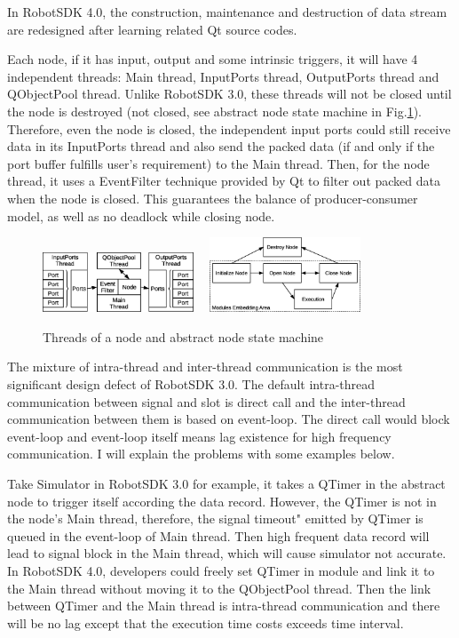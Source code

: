 \documentclass[a4paper,10pt]{book}
\begin{document}
In RobotSDK 4.0, the construction, maintenance and destruction of data stream are redesigned after learning related Qt source codes.

Each node, if it has input, output and some intrinsic triggers, it will have 4 independent threads: Main thread, InputPorts thread, OutputPorts thread and QObjectPool thread. Unlike RobotSDK 3.0, these threads will not be closed until the node is destroyed (not closed, see abstract node state machine in Fig.\ref{fig:nodestate}). Therefore, even the node is closed, the independent input ports could still receive data in its InputPorts thread and also send the packed data (if and only if the port buffer fulfills user's requirement) to the Main thread. Then, for the node thread, it uses a EventFilter technique provided by Qt to filter out packed data when the node is closed. This guarantees the balance of producer-consumer model, as well as no deadlock while closing node.

\begin{figure}
 \centering
 \includegraphics[width=0.4\textwidth]{img/threads.eps}~~
 \includegraphics[width=0.4\textwidth]{img/nodestate.eps}
 \caption{Threads of a node and abstract node state machine}
 \label{fig:nodestate}
\end{figure}

The mixture of intra-thread and inter-thread communication is the most significant design defect of RobotSDK 3.0. The default intra-thread communication between signal and slot is direct call and the inter-thread communication between them is based on event-loop. The direct call would block event-loop and event-loop itself means lag existence for high frequency communication. I will explain the problems with some examples below.

Take Simulator in RobotSDK 3.0 for example, it takes a QTimer in the abstract node to trigger itself according the data record. However, the QTimer is not in the node's Main thread, therefore, the signal timeout" emitted by QTimer is queued in the event-loop of Main thread. Then high frequent data record will lead to signal block in the Main thread, which will cause simulator not accurate. In RobotSDK 4.0, developers could freely set QTimer in module and link it to the Main thread without moving it to the QObjectPool thread. Then the link between QTimer and the Main thread is intra-thread communication and there will be no lag except that the execution time costs exceeds time interval.
\end{document}

